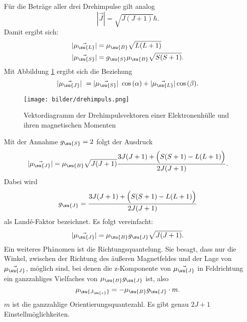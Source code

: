Für die Beträge aller drei Drehimpulse gilt analog
\begin{equation}
  |\vec{J}| = \sqrt{J(J+1)} \hbar.
\end{equation}
Damit ergibt sich:
\begin{align}
  |\vec{\mu_\su{L}}| &= \mu_\su{B}\sqrt{L(L+1)} \\
  |\vec{\mu_\su{S}}| &= g_\su{S}\mu_\su{B}\sqrt{S(S+1)}.
\end{align}
Mit Abbildung \ref{fig:drehimpuls} ergibt sich die Beziehung
\begin{equation}
  |\vec{\mu_\su{J}}| = |\vec{\mu_\su{S}}| \cos{(\alpha)} + |\vec{\mu_\su{L}}|
  \cos{(\beta)}.
\end{equation}
\begin{figure}
  \centering
  \texttt{[image: bilder/drehimpuls.png]}
  \caption{Vektordiagramm der Drehimpulsvektoren einer Elektronenhülle und ihren
  magnetischen Momenten \cite{606}}
  \label{fig:drehimpuls}
\end{figure}
Mit der Annahme $g_\su{S} = 2$ folgt der Ausdruck
\begin{equation}
  |\vec{\mu_\su{J}}| = \mu_\su{B} \sqrt{J(J+1)} \frac{3J(J+1)+\Big(S(S+1)
  -L(L+1)\Big)}{2J(J+1)}.
\end{equation}
Dabei wird
\begin{equation}
  g_\su{J} = \frac{3J(J+1)+\Big(S(S+1) -L(L+1)\Big)}{2J(J+1)}
\end{equation}
als Landé-Faktor bezeichnet.
Es folgt vereinfacht:
\begin{equation}
  |\vec{\mu_\su{J}}| = \mu_\su{B} g_\su{J} \sqrt{J(J+1)}.
\end{equation}
Ein weiteres Phänomen ist die Richtungsquantelung. Sie besagt, dass nur die Winkel,
zwischen der Richtung des äußeren Magnetfeldes und der Lage von $\vec{\mu_\su{J}}$,
möglich sind, bei denen die z-Komponente von $\vec{\mu_\su{J}}$ in Feldrichtung
ein ganzzahliges Vielfaches von $\mu_\su{B}g_\su{J}$ ist, also
\begin{equation}
  \mu_\su{J_\su{z}} = -\mu_\su{B}g_\su{J}\cdot m.
\end{equation}
$m$ ist die ganzzahlige Orientierungsquantezahl. Es gibt genau $2J+1$
Einstellmöglichkeiten.
